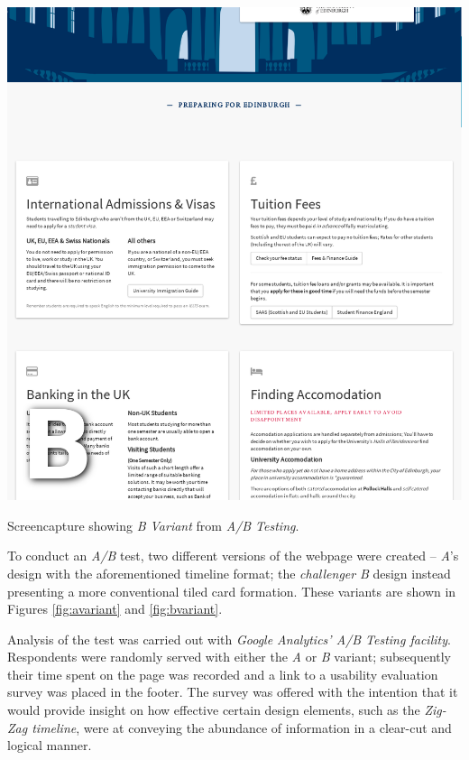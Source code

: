 \documentclass[a4paper, notoc]{tufte-handout}
\begin{document}
\begin{marginfigure}
  \includegraphics[width=\linewidth]{bvariant.png}
  \caption{
    \label{fig:bvariant}
    Screencapture showing \textit{B Variant} from \textit{A/B Testing}.
  }

\end{marginfigure}

To conduct an \textit{A/B} test, two different versions of the webpage were created -- 
\textit{A}'s design with the aforementioned timeline format; the \textit{challenger} 
\textit{B} design instead presenting a more conventional tiled card formation. These variants 
are shown in Figures \ref{fig:avariant} and \ref{fig:bvariant}.

Analysis of the test was carried out with \textit{Google Analytics' A/B Testing facility}. 
Respondents were randomly served with either the \textit{A} or \textit{B} variant; subsequently 
their time spent on the page was recorded and a link to a usability evaluation survey was
placed in the footer. The survey was offered with the intention that it would provide insight on how effective certain design elements, such as the \textit{Zig-Zag timeline}, were at conveying the abundance of information in a clear-cut and logical manner.
\end{document}
